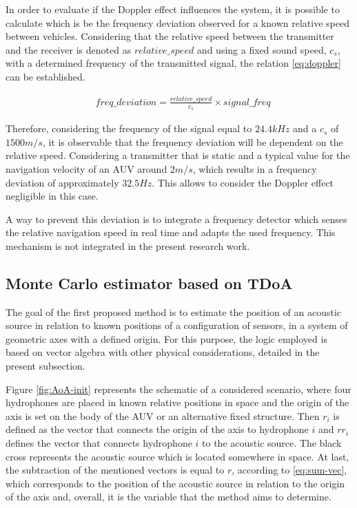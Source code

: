 In order to evaluate if the Doppler effect influences the system, it is possible to calculate which is be the frequency deviation observed for a known relative speed between vehicles. Considering that the relative speed between the transmitter and the receiver is denoted as $relative\_speed$ and using a fixed sound speed, $c_s$, with a determined frequency of the transmitted signal, the relation \ref{eq:doppler} can be established. 

\begin{eqnarray}
&freq\_deviation = \frac{relative\_speed}{c_s} \times signal\_freq
\label{eq:doppler}
\end{eqnarray}

Therefore, considering the frequency of the signal equal to $24.4kHz$ and a $c_s$ of $1500 m/s$, it is observable that the frequency deviation will be dependent on the relative speed. Considering a transmitter that is static and a typical value for the navigation velocity of an AUV around $2 m/s$, which results in a frequency deviation of approximately $32.5Hz$. This allows to consider the Doppler effect negligible in this case.

A way to prevent this deviation is to integrate a frequency detector which senses the relative navigation speed in real time and adapts the used frequency. This mechanism is not integrated in the present research work.


\subsection{Monte Carlo estimator based on TDoA} \label{subsec:estimator}

The goal of the first proposed method is to estimate the position of an acoustic source in relation to known positions of a configuration of sensors, in a system of geometric axes with a defined origin. For this purpose, the logic employed is based on vector algebra with other physical considerations, detailed in the present subsection. 

Figure \ref{fig:AoA-init} represents the schematic of a considered scenario, where four hydrophones are placed in known relative positions in space and the origin of the axis is set on the body of the AUV or an alternative fixed structure. Then $r_i$ is defined as the vector that connects the origin of the axis to hydrophone $i$ and $rr_i$ defines the vector that connects hydrophone $i$ to the acoustic source. The black cross represents the acoustic source which is located somewhere in space. At last, the subtraction of the mentioned vectors is equal to $r$, according to \ref{eq:sum-vec}, which corresponds to the position of the acoustic source in relation to the origin of the axis and, overall, it is the variable that the method aims to determine.

